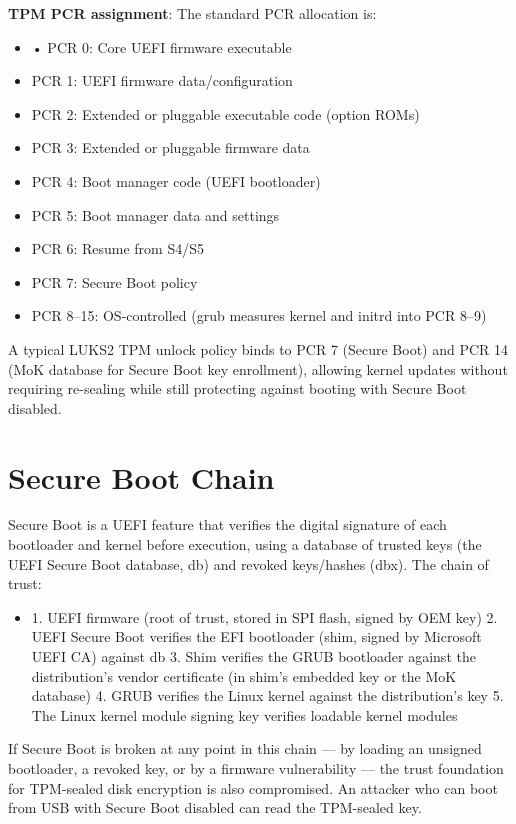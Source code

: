 \textbf{TPM PCR assignment}: The standard PCR allocation is:

\begin{itemize}
  \item • PCR 0: Core UEFI firmware executable
  \item PCR 1: UEFI firmware data/configuration
  \item PCR 2: Extended or pluggable executable code (option ROMs)
  \item PCR 3: Extended or pluggable firmware data
  \item PCR 4: Boot manager code (UEFI bootloader)
  \item PCR 5: Boot manager data and settings
  \item PCR 6: Resume from S4/S5
  \item PCR 7: Secure Boot policy
  \item PCR 8--15: OS-controlled (grub measures kernel and initrd into PCR 8--9)
\end{itemize}

A typical LUKS2 TPM unlock policy binds to PCR 7 (Secure Boot) and PCR 14 (MoK database for Secure Boot key enrollment), allowing kernel updates without requiring re-sealing while still protecting against booting with Secure Boot disabled.

\section{Secure Boot Chain}
Secure Boot is a UEFI feature that verifies the digital signature of each bootloader and kernel before execution, using a database of trusted keys (the UEFI Secure Boot database, db) and revoked keys/hashes (dbx). The chain of trust:

\begin{itemize}
  \item 1. UEFI firmware (root of trust, stored in SPI flash, signed by OEM key)
2. UEFI Secure Boot verifies the EFI bootloader (shim, signed by Microsoft UEFI CA) against db
3. Shim verifies the GRUB bootloader against the distribution's vendor certificate (in shim's embedded key or the MoK database)
4. GRUB verifies the Linux kernel against the distribution's key
5. The Linux kernel module signing key verifies loadable kernel modules
\end{itemize}

If Secure Boot is broken at any point in this chain --- by loading an unsigned bootloader, a revoked key, or by a firmware vulnerability --- the trust foundation for TPM-sealed disk encryption is also compromised. An attacker who can boot from USB with Secure Boot disabled can read the TPM-sealed key.

